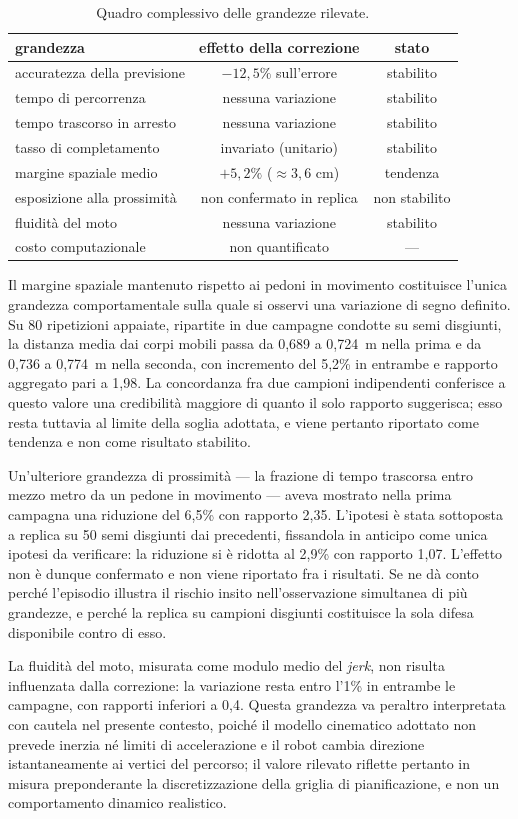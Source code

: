 \begin{table}[h]
\centering
\begin{tabular}{lcc}
\hline
grandezza & effetto della correzione & stato \\
\hline
accuratezza della previsione & $-12{,}5\%$ sull'errore & stabilito \\
tempo di percorrenza & nessuna variazione & stabilito \\
tempo trascorso in arresto & nessuna variazione & stabilito \\
tasso di completamento & invariato (unitario) & stabilito \\
margine spaziale medio & $+5{,}2\%$ ($\approx 3{,}6$ cm) & tendenza \\
esposizione alla prossimità & non confermato in replica & non stabilito \\
fluidità del moto & nessuna variazione & stabilito \\
costo computazionale & non quantificato & --- \\
\hline
\end{tabular}
\caption{Quadro complessivo delle grandezze rilevate.}
\label{tab:quadro-grandezze}
\end{table}

Il margine spaziale mantenuto rispetto ai pedoni in movimento costituisce l'unica
grandezza comportamentale sulla quale si osservi una variazione di segno definito. Su 80
ripetizioni appaiate, ripartite in due campagne condotte su semi disgiunti, la distanza
media dai corpi mobili passa da 0,689 a 0,724~m nella prima e da 0,736 a 0,774~m nella
seconda, con incremento del 5,2\% in entrambe e rapporto aggregato pari a 1,98. La
concordanza fra due campioni indipendenti conferisce a questo valore una credibilità
maggiore di quanto il solo rapporto suggerisca; esso resta tuttavia al limite della soglia
adottata, e viene pertanto riportato come tendenza e non come risultato stabilito.

Un'ulteriore grandezza di prossimità --- la frazione di tempo trascorsa entro mezzo metro
da un pedone in movimento --- aveva mostrato nella prima campagna una riduzione del 6,5\%
con rapporto 2,35. L'ipotesi è stata sottoposta a replica su 50 semi disgiunti dai
precedenti, fissandola in anticipo come unica ipotesi da verificare: la riduzione si è
ridotta al 2,9\% con rapporto 1,07. L'effetto non è dunque confermato e non viene
riportato fra i risultati. Se ne dà conto perché l'episodio illustra il rischio insito
nell'osservazione simultanea di più grandezze, e perché la replica su campioni disgiunti
costituisce la sola difesa disponibile contro di esso.

La fluidità del moto, misurata come modulo medio del \emph{jerk}, non risulta influenzata
dalla correzione: la variazione resta entro l'1\% in entrambe le campagne, con rapporti
inferiori a 0,4. Questa grandezza va peraltro interpretata con cautela nel presente
contesto, poiché il modello cinematico adottato non prevede inerzia né limiti di
accelerazione e il robot cambia direzione istantaneamente ai vertici del percorso; il
valore rilevato riflette pertanto in misura preponderante la discretizzazione della
griglia di pianificazione, e non un comportamento dinamico realistico.
